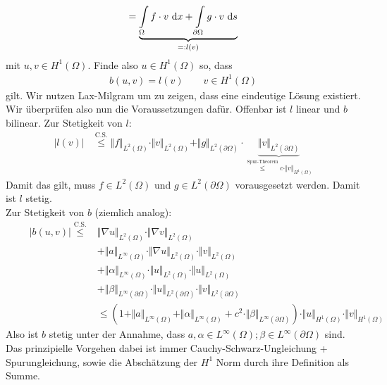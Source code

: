 \documentclass[12pt,a4paper]{article}
\begin{document}
\begin{lösung}
\begin{align*}
=\underbrace{\int\limits_\Omega f\cdot v\text{ d} x+\int\limits_{\partial\Omega} g\cdot v\text{ d} s}_{=:l(v)}
 \end{align*}
mit $u,v\in H^1(\Omega)$. Finde also $u\in H^1(\Omega)$ so, dass
\begin{align*}
b(u,v)=l(v)\qquad v\in H^1(\Omega)
\end{align*} 
gilt. Wir nutzen Lax-Milgram um zu zeigen, dass eine eindeutige Lösung existiert. Wir überprüfen also nun die Voraussetzungen dafür. Offenbar ist $l$ linear und $b$ bilinear. Zur Stetigkeit von $l$:
\begin{align*}
\big|l(v)\big|&\stackrel{\text{C.S.}}{\leq}\Vert f\Vert_{L^2(\Omega)}\cdot\Vert v\Vert_{L^2(\Omega)}+\Vert g\Vert_{L^2(\partial\Omega)}\cdot\underbrace{\Vert v\Vert_{L^2(\partial\Omega)}}_{\stackrel{\text{Spur-Theorem}}{\leq} c\cdot\Vert v\Vert_{H^1(\Omega)}}
\end{align*}
Damit das gilt, muss $f\in L^2(\Omega)$ und $g\in L^2(\partial\Omega)$ vorausgesetzt werden. Damit ist $l$ stetig.\\

Zur Stetigkeit von $b$ (ziemlich analog):
\begin{align*}
\qquad\big| b(u,v)\big|\stackrel{\text{C.S.}}{\leq}
&\Vert\nabla u\Vert_{L^2(\Omega)}\cdot\Vert\nabla v\Vert_{L^2(\Omega)}\\
&+\Vert a\Vert_{L^\infty(\Omega)}\cdot\Vert\nabla u\Vert_{L^2(\Omega)}\cdot\Vert v\Vert_{L^2(\Omega)} \\
&+\Vert\alpha\Vert_{L^\infty(\Omega)}\cdot\Vert u\Vert_{L^2(\Omega)}\cdot\Vert u\Vert_{L^2(\Omega)}\\
&+\Vert\beta\Vert_{L^\infty(\partial\Omega)}\cdot\Vert u\Vert_{L^2(\partial\Omega)}\cdot\Vert v\Vert_{L^2(\partial\Omega)}\\
&\leq
\left(1+\Vert a\Vert_{L^\infty(\Omega)}+\Vert\alpha\Vert_{L^\infty(\Omega)}+c^2\cdot\Vert\beta\Vert_{L^\infty(\partial\Omega)}\right)\cdot\Vert u\Vert_{H^1(\Omega)}\cdot\Vert v\Vert_{H^1(\Omega)}
\end{align*}
Also ist $b$ stetig unter der Annahme, dass $a, \alpha \in L^\infty(\Omega); \beta \in L^\infty(\partial\Omega)$ sind. Das prinzipielle Vorgehen dabei ist immer Cauchy-Schwarz-Ungleichung + Spurungleichung, sowie die Abschätzung der $H^1$ Norm durch ihre Definition als Summe.\\
 

\end{lösung}
\end{document}
